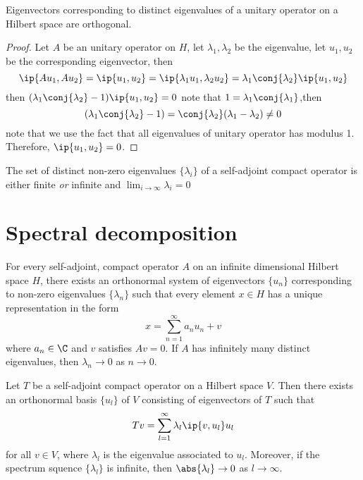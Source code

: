 \begin{refsection}
\begin{theorem}
\cite[182]{debnath2005hilbert} Eigenvectors corresponding to distinct eigenvalues of a unitary operator on a Hilbert space are orthogonal.
\end{theorem}
\begin{proof}
Let $A$ be an unitary operator on $H$, let $\lambda_1,\lambda_2$ be the eigenvalue, let $u_1,u_2$ be the corresponding eigenvector, then
$$\ip{Au_1,Au_2} = \ip{u_1,u_2} = \ip{\lambda_1u_1,\lambda_2u_2} = \lambda_1\conj{\lambda_2}\ip{u_1,u_2}$$
then $(\lambda_1\conj{\lambda_2}-1)\ip{u_1,u_2} = 0$
note that $1 = \lambda_1\conj{\lambda_1}$,then $$(\lambda_1\conj{\lambda_2}-1) = \conj{\lambda_2}(\lambda_1-\lambda_2) \neq 0$$
note that we use the fact that all eigenvalues of unitary operator has modulus 1.
Therefore, $\ip{u_1,u_2} = 0$.	
\end{proof}



\begin{theorem}
\cite[185]{debnath2005hilbert} The set of distinct non-zero eigenvalues $\{\lambda_i\}$ of a self-adjoint compact operator is either finite \emph{or} infinite and $\lim_{i\to \infty} \lambda_i = 0$
\end{theorem}



\section{Spectral decomposition}\label{ch:functional-analysis:sec:spectral-decomposition}
\begin{theorem}
\cite[188]{debnath2005hilbert}
For every self-adjoint, compact operator $A$ on an infinite dimensional Hilbert space $H$, there exists an orthonormal system of eigenvectors $\{u_n\}$ corresponding to non-zero eigenvalues $\{\lambda_n\}$ such that every element $x\in H$ has a unique representation in the form
$$x = \sum_{n=1}^\infty a_nu_n + v$$
where $a_n \in \C$ and $v$ satisfies $Av = 0$. If $A$ has infinitely many distinct eigenvalues, then $\lambda_n\to 0$ as $n \to 0$.
\end{theorem}




\begin{theorem} \cite[190]{debnath2005hilbert}Let $T$ be a self-adjoint compact operator on a Hilbert space $V$. Then there exists an orthonormal basis $\{u_l\}$  of $V$ consisting of eigenvectors of $T$ such that
$$Tv = \sum_{l=1}^\infty \lambda_l \ip{v,u_l}u_l$$
for all $v\in V$, where $\lambda_l$ is the eigenvalue associated to $u_l$. Moreover, if the spectrum squence $\{\lambda_l\}$ is infinite, then $\abs{\lambda_l} \to 0$ as $l \to \infty$.
\end{theorem}






\end{refsection}
